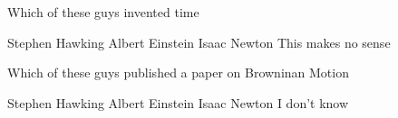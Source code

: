 \documentclass{exam}
\begin{document}
\begin{questions}  
\question Which of these guys invented time
 
\begin{choices}
 \choice Stephen Hawking 
 \choice Albert Einstein
 \choice Isaac Newton
 \choice This makes no sense
\end{choices}
 
\question Which of these guys published a paper on Browninan Motion
 
\begin{checkboxes}
 \choice Stephen Hawking 
 \choice Albert Einstein
 \choice Isaac Newton
 \choice I don't know
\end{checkboxes}
\end{questions}
\end{document}
